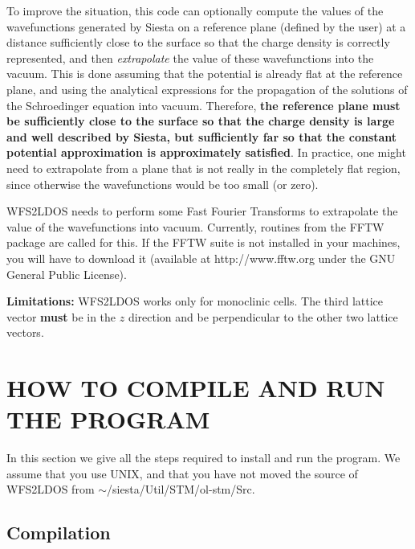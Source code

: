 To improve the situation, this code can optionally compute
the values of the wavefunctions generated by {\sc Siesta} on a reference
plane (defined by the user) at a distance sufficiently close to the
surface so that the charge density is correctly represented, and then
{\em extrapolate}
the value of these wavefunctions into the vacuum. This
is done assuming that the potential is already flat at the reference
plane, and using the analytical expressions for the propagation of the
solutions of the Schroedinger equation into vacuum. Therefore, {\bf
  the reference plane must be sufficiently close to the surface so
  that the charge density is large and well described by {\sc Siesta},
  but sufficiently far so that the constant potential approximation is
  approximately satisfied}. In practice, one might need to extrapolate
from a plane that is not really in the completely flat region, since
otherwise the wavefunctions would be too small (or zero).

{\sc WFS2LDOS} needs to perform some Fast Fourier Transforms to
extrapolate the value of the wavefunctions into vacuum.
Currently, routines from the FFTW package are called for this.
If the FFTW suite is not installed in your machines, you
will have to download it (available at http://www.fftw.org
under the GNU General Public License).

\noindent
{\bf Limitations:} {\sc WFS2LDOS} works only for monoclinic cells.
The third lattice vector {\bf must} be in the $z$ direction
and be perpendicular to the other two lattice vectors.

\section{HOW TO COMPILE AND RUN THE PROGRAM}

In this section we give all the steps required to install and run the
program.  We assume that you use UNIX, and that you have not moved the
source of {\sc WFS2LDOS} from $\sim$/siesta/Util/STM/ol-stm/Src.

\subsection{Compilation}

